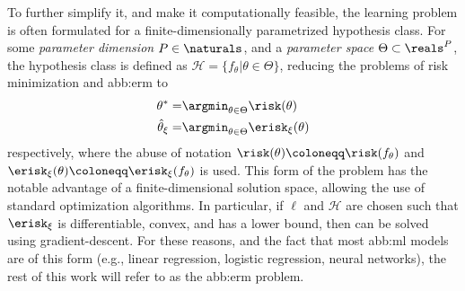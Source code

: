 To further simplify it, and make it computationally feasible,
the learning problem is often formulated for a
finite-dimensionally parametrized hypothesis class.
For some \emph{parameter dimension} \(P \in \naturals\),
and a \emph{parameter space} \(\Theta \subset \reals^{P}\),
the hypothesis class is defined as $\mathcal{H} =\{ f_{\theta} | \theta \in \Theta \}$,
reducing the problems of risk minimization and \gls{abb:erm} to
\begin{align}
  \theta^{\ast} =      & \argmin_{\theta \in \Theta} \risk(\theta)\label{eq:parametric_risk_minimization} \\
  \hat{\theta}_{\xi} = & \argmin_{\theta \in \Theta} \erisk_{\xi}(\theta)\label{eq:parametric_erm}
\end{align}
respectively, where the abuse of notation
\(\risk(\theta) \coloneqq \risk(f_{\theta})\) and
\(\erisk_{\xi}(\theta) \coloneqq \erisk_{\xi}(f_{\theta})\)
is used.
This form of the problem has the notable advantage of a finite-dimensional solution space,
allowing the use of standard optimization algorithms.
In particular, if \(\ell\) and \(\mathcal{H}\) are chosen such that
\(\erisk_{\xi}\) is differentiable, convex, and has a lower bound,
then  can be solved using gradient-descent.
For these reasons, and the fact that most \gls{abb:ml} models are of this form
(e.g., linear regression, logistic regression, neural networks),
the rest of this work will refer to  as the \gls{abb:erm} problem.
